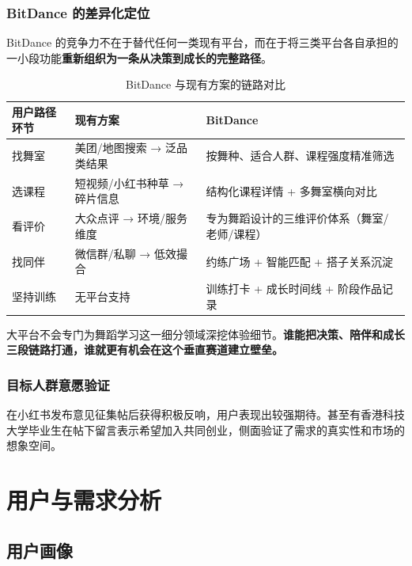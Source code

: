 \documentclass[12pt,a4paper]{ctexart}
\begin{document}
\subsubsection{BitDance 的差异化定位}

BitDance 的竞争力不在于替代任何一类现有平台，而在于将三类平台各自承担的一小段功能\textbf{重新组织为一条从决策到成长的完整路径}。

\begin{table}[H]
\centering
\caption{BitDance 与现有方案的链路对比}
\begin{tabularx}{\textwidth}{L{2.5cm}X X}
\toprule
\textbf{用户路径环节} & \textbf{现有方案} & \textbf{BitDance} \\
\midrule
找舞室 & 美团/地图搜索 → 泛品类结果 & 按舞种、适合人群、课程强度精准筛选 \\
选课程 & 短视频/小红书种草 → 碎片信息 & 结构化课程详情 + 多舞室横向对比 \\
看评价 & 大众点评 → 环境/服务维度 & 专为舞蹈设计的三维评价体系（舞室/老师/课程） \\
找同伴 & 微信群/私聊 → 低效撮合 & 约练广场 + 智能匹配 + 搭子关系沉淀 \\
坚持训练 & 无平台支持 & 训练打卡 + 成长时间线 + 阶段作品记录 \\
\bottomrule
\end{tabularx}
\end{table}

大平台不会专门为舞蹈学习这一细分领域深挖体验细节。\textbf{谁能把决策、陪伴和成长三段链路打通，谁就更有机会在这个垂直赛道建立壁垒。}

\subsubsection{目标人群意愿验证}

在小红书发布意见征集帖后获得积极反响，用户表现出较强期待。甚至有香港科技大学毕业生在帖下留言表示希望加入共同创业，侧面验证了需求的真实性和市场的想象空间。

\section{用户与需求分析}

\subsection{用户画像}
\end{document}
